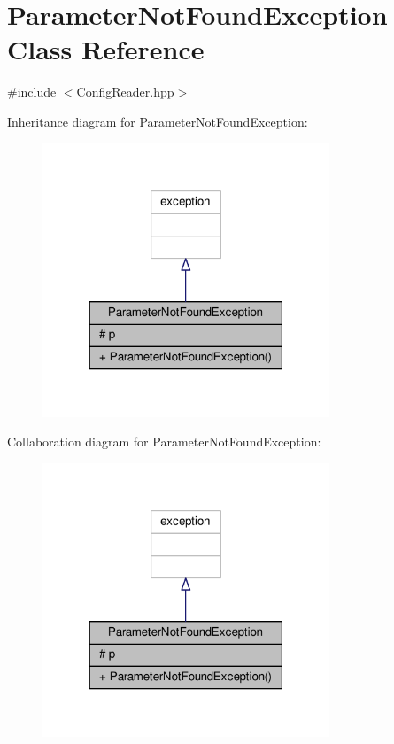 \hypertarget{class_parameter_not_found_exception}{}\section{Parameter\+Not\+Found\+Exception Class Reference}
\label{class_parameter_not_found_exception}


{\ttfamily \#include $<$Config\+Reader.\+hpp$>$}



Inheritance diagram for Parameter\+Not\+Found\+Exception\+:\nopagebreak
\begin{figure}[H]
\begin{center}
\leavevmode
\includegraphics[width=243pt]{class_parameter_not_found_exception__inherit__graph}
\end{center}
\end{figure}


Collaboration diagram for Parameter\+Not\+Found\+Exception\+:\nopagebreak
\begin{figure}[H]
\begin{center}
\leavevmode
\includegraphics[width=243pt]{class_parameter_not_found_exception__coll__graph}
\end{center}
\end{figure}
